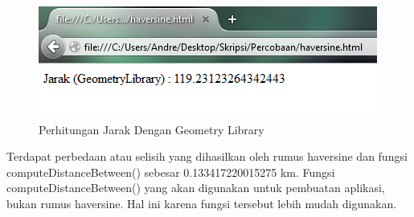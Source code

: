 \begin{figure}[h]
\centering
\includegraphics[scale=1]{Gambar/analisis_geometry}
\caption[Perhitungan Jarak Dengan Geometry Library]{Perhitungan Jarak Dengan
Geometry Library}
\label{fig:analisis_geometry}
\end{figure}
Terdapat perbedaan atau selisih yang dihasilkan oleh rumus haversine dan
fungsi computeDistanceBetween() sebesar 0.133417220015275 km. Fungsi 
computeDistanceBetween() yang akan digunakan untuk pembuatan aplikasi, bukan
rumus haversine. Hal ini karena fungsi tersebut lebih mudah digunakan.


